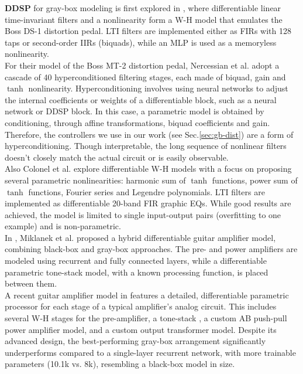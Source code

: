 \textbf{DDSP} for gray-box modeling is first explored in \citep{kuznetsov2020differentiable}, where differentiable linear time-invariant filters and a nonlinearity form a W-H model that emulates the Boss DS-1 distortion pedal.
LTI filters are implemented either as FIRs with 128 taps or second-order IIRs (biquads), while an MLP is used as a memoryless nonlinearity.\\
For their model of the Boss MT-2 distortion pedal, Nercessian et al. \citep{nercessian2021lightweight} adopt a cascade of 40 hyperconditioned filtering stages, each made of biquad, gain and $\tanh$ nonlinearity.
Hyperconditioning \citep{ha2022hypernetworks, serra2019blow} involves using neural networks to adjust the internal coefficients or weights of a differentiable block, such as a neural network or DDSP block. 
In this case, a parametric model is obtained by conditioning, through affine transformations, biquad coefficients and gain.
Therefore, the controllers we use in our work (see Sec.\ref{sec:gb-dist}) are a form of hyperconditioning. 
Though interpretable, the long sequence of nonlinear filters doesn't closely match the actual circuit or is easily observable.\\
Also Colonel et al. \citep{colonel2022reverse} explore differentiable W-H models with a focus on proposing several parametric nonlinearities: harmonic sum of $\tanh$ functions, power sum of $\tanh$ functions, Fourier series and Legendre polynomials.
LTI filters are implemented as differentiable 20-band FIR graphic EQs. 
While good results are achieved, the model is limited to single input-output pairs (overfitting to one example) and is non-parametric.\\
In \citep{miklanek2023neural}, Miklanek et al. proposed a hybrid differentiable guitar amplifier model, combining black-box and gray-box approaches. The pre- and power amplifiers are modeled using recurrent and fully connected layers, while a differentiable parametric tone-stack model, with a known processing function, is placed between them.\\
A recent guitar amplifier model in \citep{yeh2024ddsp} features a detailed, differentiable parametric processor for each stage of a typical amplifier's analog circuit. 
This includes several W-H stages for the pre-amplifier, a tone-stack \citep{miklanek2023neural}, a custom AB push-pull power amplifier model, and a custom output transformer model. 
Despite its advanced design, the best-performing gray-box arrangement significantly underperforms compared to a single-layer recurrent network, with more trainable parameters (10.1k vs. 8k), resembling a black-box model in size.



